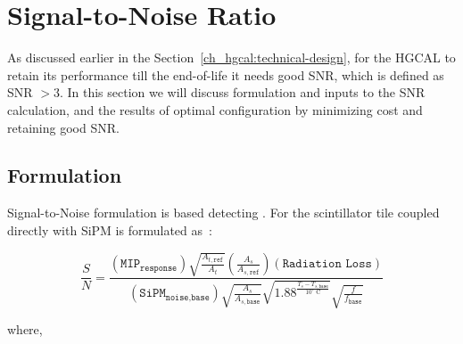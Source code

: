 \clearpage
\section{
  Signal-to-Noise Ratio
 }

As discussed earlier in the Section~\ref{ch_hgcal:technical-design},
for the \gls{HGCAL} to retain its performance till the end-of-life it needs
good \gls{SNR}, which is defined as \gls{SNR} \( > 3\). In this section we
will discuss formulation and inputs to the \gls{SNR} calculation, and
the results of optimal configuration by minimizing cost and
retaining good \gls{SNR}.

\subsection{
  Formulation
}

Signal-to-Noise formulation is based detecting .
For the scintillator tile coupled directly with SiPM is formulated as~\cite{cms-dn-17-001}:

\begin{equation}
  \frac{S}{N} =
  \frac{
  (\texttt{MIP}_\texttt{response})
  \sqrt{\frac{A_{t,\texttt{ref}}}{A_{t}}}
  \left(\frac{A_{s}}{A_{s,\texttt{ref}}}\right)
  (\texttt{Radiation Loss})
  }
  {
  (\texttt{SiPM}_\texttt{noise,base})
  \sqrt{\frac{A_{s}}{A_{s,\texttt{base}}}}
  \sqrt{1.88^{\frac{T_{s}-T_{s,\texttt{base}}}{10^{\circ} \text{ C}}}}
  \sqrt{\frac{f}{f_{\texttt{base}}}}
  }
\end{equation}

where,

